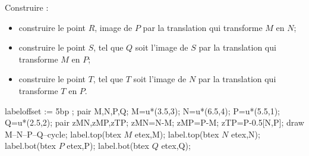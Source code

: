 \begin{exercice*}
    Construire :
    \begin{itemize}
        \item construire le point $R$, image de $P$ par la translation qui transforme $M$ en $N$;
        \item construire le point $S$, tel que $Q$ soit l'image de $S$ par la translation qui transforme $M$ en $P$;
        \item construire le point $T$, tel que $T$ soit l'image de $N$ par la translation qui transforme $T$ en $P$.
    \end{itemize}
    \begin{Geometrie}[CoinHD={(9u,5u)}]
        labeloffset := 5bp ;
        pair M,N,P,Q;
        M=u*(3.5,3);
        N=u*(6.5,4);
        P=u*(5.5,1);
        Q=u*(2.5,2);
        pair zMN,zMP,zTP;
        zMN=N-M;
        zMP=P-M;
        zTP=P-0.5[N,P];
        draw M--N--P--Q--cycle;
        label.top(btex $M$ etex,M);
        label.top(btex $N$ etex,N);
        label.bot(btex $P$ etex,P);
        label.bot(btex $Q$ etex,Q);
    \end{Geometrie}
\end{exercice*}
